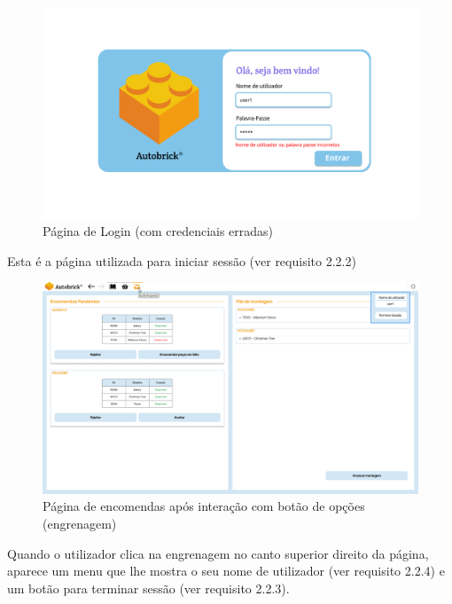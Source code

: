         \begin{figure}[h!]
            \centering
            \includegraphics[width=0.99\linewidth, frame]{images/Login Failed.pdf}
            \caption{Página de Login (com credenciais erradas) }
            \label{fig:Login}
        \end{figure}
    
        Esta é a página utilizada para iniciar sessão (ver requisito 2.2.2)

        \clearpage
        \begin{figure}[h!]
            \centering
            \includegraphics[width=0.99\linewidth, frame]{images/Settings.pdf}
            \caption{Página de encomendas após interação com botão de opções (engrenagem)}
            \label{fig:Settings}
        \end{figure}
        
        Quando o utilizador clica na engrenagem no canto superior direito da página, aparece um menu que lhe mostra o seu nome de utilizador (ver requisito 2.2.4) e um botão para terminar sessão (ver requisito 2.2.3).
    
